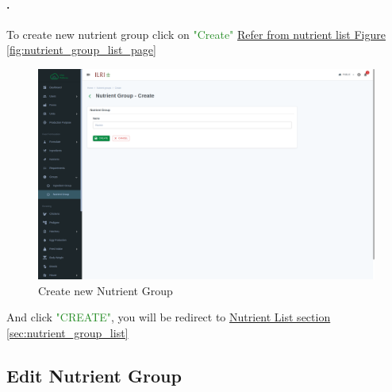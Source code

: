 \paragraph{.}To create new nutrient group click on \textcolor{ForestGreen}{"Create"} \hyperref[fig:nutrient_group_list_page]{Refer from nutrient list Figure \ref{fig:nutrient_group_list_page}}
\begin{figure}[h!]
  	\includegraphics[width=15cm]{screenshots/nutrient_group_create_page.png}
  	\caption{Create new Nutrient Group}
  	\label{fig:nutrient_group_create_page}
\end{figure}
And click \textcolor{ForestGreen}{"CREATE"}, you will be redirect to  \hyperref[sec:nutrient_group_list]{Nutrient List section \ref{sec:nutrient_group_list}}

\subsection{Edit Nutrient Group}\label{sec:nutrient_group_edit}
\setcounter{stepcounter}{1}
